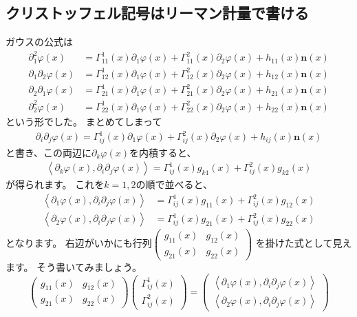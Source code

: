 \subsection{クリストッフェル記号はリーマン計量で書ける}

ガウスの公式は
\begin{align*}
  \partial_1^2\varphi(x)&=\Gamma_{11}^1(x)\partial_1\varphi(x)+\Gamma_{11}^2(x)\partial_2\varphi(x)+h_{11}(x)\mathbf{n}(x)\\
  \partial_1\partial_2\varphi(x)&=\Gamma_{12}^1(x)\partial_1\varphi(x)+\Gamma_{12}^2(x)\partial_2\varphi(x)+h_{12}(x)\mathbf{n}(x)\\
  \partial_2\partial_1\varphi(x)&=\Gamma_{21}^1(x)\partial_1\varphi(x)+\Gamma_{21}^2(x)\partial_2\varphi(x)+h_{21}(x)\mathbf{n}(x)\\
  \partial_2^2\varphi(x)&=\Gamma_{22}^1(x)\partial_1\varphi(x)+\Gamma_{22}^2(x)\partial_2\varphi(x)+h_{22}(x)\mathbf{n}(x)
\end{align*}
という形でした。
まとめてしまって
\begin{align*}
  \partial_i\partial_j\varphi(x)=\Gamma_{ij}^1(x)\partial_1\varphi(x)+\Gamma_{ij}^2(x)\partial_2\varphi(x)+h_{ij}(x)\mathbf{n}(x)
\end{align*}
と書き、この両辺に$\partial_k\varphi(x)$を内積すると、
\begin{align*}
  \left<\partial_k\varphi(x),\partial_i\partial_j\varphi(x)\right>=\Gamma_{ij}^1(x)g_{k1}(x)+\Gamma_{ij}^2(x)g_{k2}(x)
\end{align*}
が得られます。
これを$k=1,2$の順で並べると、
\begin{align*}
  \left<\partial_1\varphi(x),\partial_i\partial_j\varphi(x)\right>&=\Gamma_{ij}^1(x)g_{11}(x)+\Gamma_{ij}^2(x)g_{12}(x)\\
  \left<\partial_2\varphi(x),\partial_i\partial_j\varphi(x)\right>&=\Gamma_{ij}^1(x)g_{21}(x)+\Gamma_{ij}^2(x)g_{22}(x)
\end{align*}
となります。
右辺がいかにも行列$\begin{pmatrix}
  g_{11}(x)&g_{12}(x)\\
  g_{21}(x)&g_{22}(x)
\end{pmatrix}$
を掛けた式として見えます。
そう書いてみましょう。
\[
  \begin{pmatrix}
    g_{11}(x) & g_{12}(x)\\
    g_{21}(x) & g_{22}(x)
  \end{pmatrix}
  \begin{pmatrix}
    \Gamma_{ij}^1(x) \\ \Gamma_{ij}^2(x)
  \end{pmatrix}
  =
  \begin{pmatrix}
    \left<\partial_1\varphi(x),\partial_i\partial_j\varphi(x)\right>\\
    \left<\partial_2\varphi(x),\partial_i\partial_j\varphi(x)\right>
  \end{pmatrix}
\]
